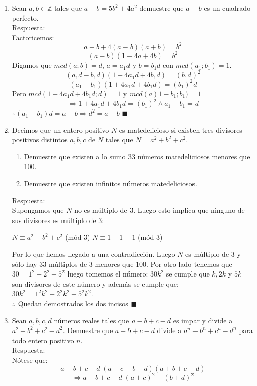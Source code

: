 \documentclass{book}
\newcommand{\Z}{\mathbb{Z}} \def\max{\mathop{\mbox{\rm máx}}} %
\begin{document}
\begin{enumerate}
 			  
			\item Sean $a,b\in \Z$ tales que $a-b=5b^2+4a^2$ demuestre que $a-b$ es un cuadrado perfecto.\\
			Respuesta:\\		
			Factoricemos:
				$$a - b + 4(a - b)(a + b) = b^2$$ 
				$$(a-b)(1 + 4a + 4b) = b^2$$ 
				Digamos que $mcd(a;b) = d$, $a = a_1d$ y $b = b_1d$ con $mcd(a_1;b_1) = 1$. 					$$(a_1d - b_1d)(1 + 4a_1d + 4b_1d) = (b_1d)^2$$ 
				$$(a_1 - b_1)(1 + 4a_1d + 4b_1d) = (b_1)^2d$$ 
				Pero $mcd(1 + 4a_1d + 4b_1d;d) = 1$ y $mcd(a)1 - b_1;b_1) = 1$
				$$\Rightarrow 1 + 4a_1d + 4b_1d = (b_1)^2 \wedge a_1 - b_1 = d$$
				 $\therefore (a_1 - b_1)d = a - b \Rightarrow d^2 = a - b$ $\blacksquare$ \\
			\item Decimos que un entero positivo $N$ es matedelicioso si existen tres divisores positivos distintos $a,b,c$ de $N$ tales que $N = a^2 + b^2 + c^2$.
			\begin{enumerate}
				 \item Demuestre que existen a lo sumo 33 números matedeliciosos menores que 100.  
				 \item Demuestre que existen infinitos números matedeliciosos. 
			\end{enumerate}
			Respuesta:\\
			Supongamos que $N$ no es múltiplo de 3. Luego esto implica que ninguno de sus divisores es múltiplo de 3:
				\begin{center}
					$N\equiv a^2 + b^2 + c^2$ (mód 3) 
					$N\equiv  1 + 1 + 1$ (mód 3)
				\end{center}			
				 Por lo que hemos llegado a una contradicción. Luego $N$ es múltiplo de 3 y sólo hay 33 múltiplos de 3 menores que 100. Por otro lado tenemos que $30 = 1^2 + 2^2 + 5^2$ luego tomemos el número: $30k^2$ se cumple que $k,2k$ y $5k$ son divisores de este número y además se cumple que: $30k^2 = 1^2k^2 + 2^2k^2 + 5^2k^2$.\\ 
				$\therefore$ Quedan demostrados los dos incisos $\blacksquare$ \\
			\item Sean $a,b,c,d$ números reales tales que $a-b+c-d$ es impar y divide a $a^2-b^2+c^2-d^2$. Demuestre que
			$a-b+c-d$ divide a $a^n-b^n+c^n-d^n$ para todo entero positivo $n$.\\
			Respuesta:\\
			Nótese que:              
				$$a-b + c-d| (a + c - b - d)(a + b + c + d)$$ 
				$$ \Rightarrow a-b + c-d |(a+ c)^2 - (b + d)^2 $$ 

\end{enumerate}
\end{document}
